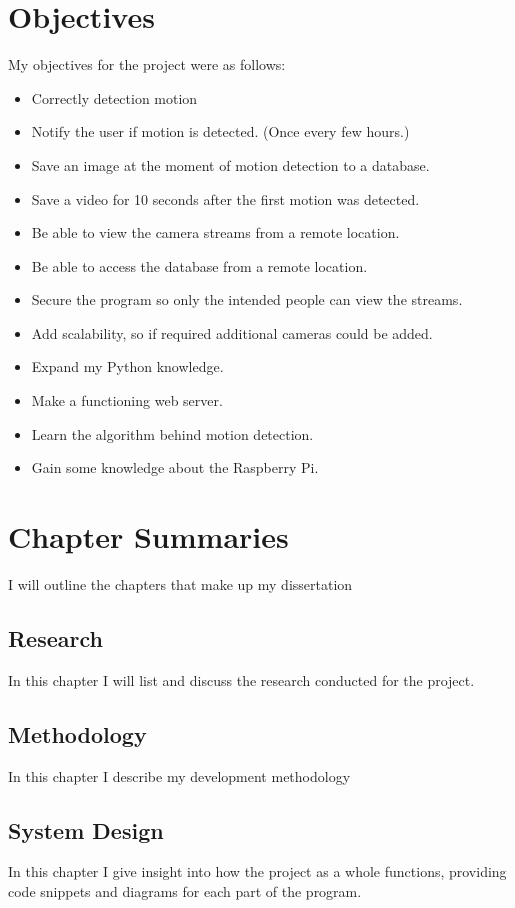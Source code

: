 \section{Objectives} My objectives for the project were as follows:
\begin{itemize}
    \item Correctly detection motion
    \item Notify the user if motion is detected. (Once every few hours.)
    \item Save an image at the moment of motion detection to a database.
    \item Save a video for 10 seconds after the first motion was detected.
    \item Be able to view the camera streams from a remote location.
    \item Be able to access the database from a remote location.
    \item Secure the program so only the intended people can view the streams.
    \item Add scalability, so if required additional cameras could be added.
    \item Expand my Python knowledge.
    \item Make a functioning web server.
    \item Learn the algorithm behind motion detection.
    \item Gain some knowledge about the Raspberry Pi.
\end{itemize}

\section{Chapter Summaries}
I will outline the chapters that make up my dissertation 
\subsection{Research}
In this chapter I will list and discuss the research conducted for the project.
\subsection{Methodology}
In this chapter I describe my development methodology 
\subsection{System Design}
In this chapter I give insight into how the project as a whole functions, providing code snippets and diagrams for each part of the program.
